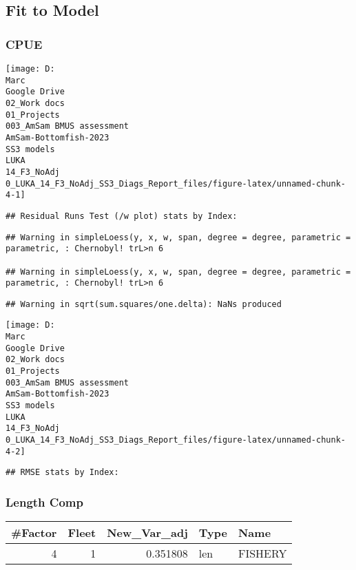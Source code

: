 \documentclass[
]{article}
\begin{document}
\hypertarget{fit-to-model}{%
\subsection{Fit to Model}\label{fit-to-model}}

\hypertarget{cpue}{%
\subsubsection{CPUE}\label{cpue}}

\begin{center}\texttt{[image: D:\\Marc\\Google Drive\\02\_Work docs\\01\_Projects\\003\_AmSam BMUS assessment\\AmSam-Bottomfish-2023\\SS3 models\\LUKA\\14\_F3\_NoAdj\\0\_LUKA\_14\_F3\_NoAdj\_SS3\_Diags\_Report\_files/figure-latex/unnamed-chunk-4-1]} \end{center}

\begin{verbatim}
## Residual Runs Test (/w plot) stats by Index:
\end{verbatim}

\begin{verbatim}
## Warning in simpleLoess(y, x, w, span, degree = degree, parametric = parametric, : Chernobyl! trL>n 6

## Warning in simpleLoess(y, x, w, span, degree = degree, parametric = parametric, : Chernobyl! trL>n 6
\end{verbatim}

\begin{verbatim}
## Warning in sqrt(sum.squares/one.delta): NaNs produced
\end{verbatim}

\begin{center}\texttt{[image: D:\\Marc\\Google Drive\\02\_Work docs\\01\_Projects\\003\_AmSam BMUS assessment\\AmSam-Bottomfish-2023\\SS3 models\\LUKA\\14\_F3\_NoAdj\\0\_LUKA\_14\_F3\_NoAdj\_SS3\_Diags\_Report\_files/figure-latex/unnamed-chunk-4-2]} \end{center}

\begin{verbatim}
## RMSE stats by Index:
\end{verbatim}

\hypertarget{length-comp}{%
\subsubsection{Length Comp}\label{length-comp}}

\captionsetup[table]{labelformat=empty,skip=1pt}
\begin{longtable}{rrrll}
\toprule
\#Factor & Fleet & New\_Var\_adj & Type & Name \\ 
\midrule
4 & 1 & 0.351808 & len & FISHERY \\ 
\bottomrule
\end{longtable}
\end{document}
